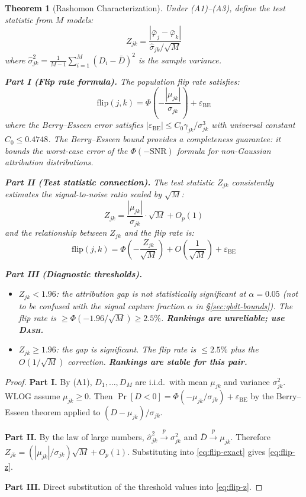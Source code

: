 \documentclass{article}
\newtheorem{theorem}{Theorem}
\newcommand{\DASH}{\textsc{Dash}}
\begin{document}
\begin{theorem}[Rashomon Characterization]
\label{thm:testable}
Under (A1)--(A3), define the test statistic from $M$ models:
\[
    Z_{jk} = \frac{|\bar\varphi_j - \bar\varphi_k|}{\hat\sigma_{jk}/\sqrt{M}}
\]
where $\hat\sigma_{jk}^2 = \frac{1}{M-1}\sum_{i=1}^M (D_i - \bar{D})^2$ is the sample variance.

\textbf{Part I (Flip rate formula).} The population flip rate satisfies:
\begin{equation}
\label{eq:flip-exact}
    \text{flip}(j,k) = \Phi\!\left(-\frac{|\mu_{jk}|}{\sigma_{jk}}\right) + \varepsilon_{\text{BE}}
\end{equation}
where the Berry--Esseen error satisfies $|\varepsilon_{\text{BE}}| \leq C_0 \gamma_{jk} / \sigma_{jk}^3$ with universal constant $C_0 \leq 0.4748$. The Berry--Esseen bound provides a completeness guarantee: it bounds the worst-case error of the $\Phi(-\text{SNR})$ formula for non-Gaussian attribution distributions.

\textbf{Part II (Test statistic connection).} The test statistic $Z_{jk}$ consistently estimates the signal-to-noise ratio scaled by $\sqrt{M}$:
\[
    Z_{jk} = \frac{|\mu_{jk}|}{\sigma_{jk}} \cdot \sqrt{M} + O_p(1)
\]
and the relationship between $Z_{jk}$ and the flip rate is:
\begin{equation}
\label{eq:flip-z}
    \text{flip}(j,k) = \Phi\!\left(-\frac{Z_{jk}}{\sqrt{M}}\right) + O\!\left(\frac{1}{\sqrt{M}}\right) + \varepsilon_{\text{BE}}
\end{equation}

\textbf{Part III (Diagnostic thresholds).}
\begin{itemize}
    \item $Z_{jk} < 1.96$: the attribution gap is not statistically significant at $\alpha = 0.05$ (not to be confused with the signal capture fraction $\alpha$ in \S\ref{sec:gbdt-bounds}). The flip rate is $\geq \Phi(-1.96/\sqrt{M}) \geq 2.5\%$. \textbf{Rankings are unreliable; use \DASH{}.}
    \item $Z_{jk} \geq 1.96$: the gap is significant. The flip rate is $\leq 2.5\%$ plus the $O(1/\sqrt{M})$ correction. \textbf{Rankings are stable for this pair.}
\end{itemize}
\end{theorem}

\begin{proof}
\textbf{Part I.} By (A1), $D_1, \ldots, D_M$ are i.i.d.\ with mean $\mu_{jk}$ and variance $\sigma_{jk}^2$. WLOG assume $\mu_{jk} \geq 0$. Then $\Pr[D < 0] = \Phi(-\mu_{jk}/\sigma_{jk}) + \varepsilon_{\text{BE}}$ by the Berry--Esseen theorem applied to $(D - \mu_{jk})/\sigma_{jk}$.

\textbf{Part II.} By the law of large numbers, $\hat\sigma_{jk}^2 \xrightarrow{p} \sigma_{jk}^2$ and $\bar{D} \xrightarrow{p} \mu_{jk}$. Therefore $Z_{jk} = (|\mu_{jk}|/\sigma_{jk})\sqrt{M} + O_p(1)$. Substituting into \eqref{eq:flip-exact} gives \eqref{eq:flip-z}.

\textbf{Part III.} Direct substitution of the threshold values into \eqref{eq:flip-z}.
\end{proof}
\end{document}
